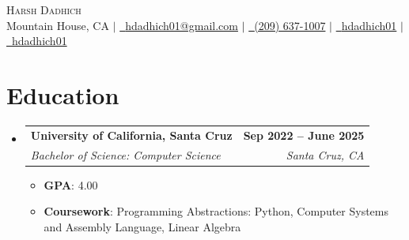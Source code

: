 \documentclass[letterpaper,11pt]{article}
\makeatletter
\newcommand{\resumeSubheading}[4]{
  \vspace{-2pt}\item
    \begin{tabular*}{1.0\textwidth}[t]{l@{\extracolsep{\fill}}r}
      \textbf{#1} & \textbf{\small #2} \\
      \textit{\small#3} & \textit{\small #4} \\
    \end{tabular*}\vspace{-7pt}
}
\newcommand{\resumeSubHeadingListStart}{\begin{itemize}[leftmargin=0.0in, label={}]}
\newcommand{\resumeSubHeadingListEnd}{\end{itemize}}
\makeatother
\begin{document}

\begin{center}
	{\Huge \scshape Harsh Dadhich} \\ \vspace{1pt}
	Mountain House, CA $|$ \color[HTML]{0000EE}\href{mailto:hdadhich01@gmail.com}{\faEnvelope~{hdadhich01@gmail.com}} \textcolor{black}{$|$} \color[HTML]{0000EE}\href{tel:+12096371007}{\small \raisebox{-0.1\height}\faPhone~{(209) 637-1007}} \textcolor{black}{$|$} \color[HTML]{0000EE}\href{https://www.linkedin.com/in/hdadhich01/}{\faLinkedin~{hdadhich01}} \textcolor{black}{$|$} \color[HTML]{0000EE}\href{https://github.com/hdadhich01}{\faGithub~{hdadhich01}}
	\vspace{-10pt}
\end{center}

\section{Education}
\resumeSubHeadingListStart

\resumeSubheading
{University of California, Santa Cruz}{Sep 2022 -- June 2025}
{Bachelor of Science: Computer Science}{Santa Cruz, CA}
\begin{itemize}[itemsep=-1pt, parsep=1pt]
	\item\small \textbf{GPA}{: 4.00}
	\item \textbf{Coursework}{: Programming Abstractions: Python, Computer Systems and Assembly Language, Linear Algebra}
\end{itemize}

\resumeSubHeadingListEnd
\vspace{-10pt}
\end{document}
